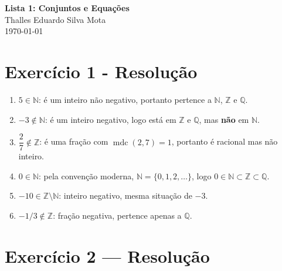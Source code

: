 \documentclass[12pt, a4paper]{article}
\newcommand{\NomeAluno}{Thalles Eduardo Silva Mota}             %
\begin{document}
\begin{center}
  {\Large\bfseries\color{ufmtAzul} Lista 1: Conjuntos e Equações}\\[6pt]
  {\large \NomeAluno}\\[3pt]
  {\normalsize\color{ufmtCinza} \today}
\end{center}

\vspace{0.5cm}

\section*{Exercício 1 - Resolução}
 
\begin{enumerate}[label=(\alph*)]
 
    \item $5 \in \mathbb{N}$: é um inteiro não negativo, portanto pertence
    a $\mathbb{N}$, $\mathbb{Z}$ e $\mathbb{Q}$.
 
    \item $-3 \notin \mathbb{N}$: é um inteiro negativo, logo está em
    $\mathbb{Z}$ e $\mathbb{Q}$, mas \textbf{não} em $\mathbb{N}$.
 
    \item $\dfrac{2}{7} \notin \mathbb{Z}$: é uma fração com
    $\operatorname{mdc}(2,7) = 1$, portanto é racional mas não inteiro.
 
    \item $0 \in \mathbb{N}$: pela convenção moderna,
    $\mathbb{N} = \{0, 1, 2, \ldots\}$, logo $0 \in \mathbb{N} \subset
    \mathbb{Z} \subset \mathbb{Q}$.
 
    \item $-10 \in \mathbb{Z} \setminus \mathbb{N}$: inteiro negativo,
    mesma situação de $-3$.
 
    \item $-1/3 \notin \mathbb{Z}$: fração negativa, pertence apenas
    a $\mathbb{Q}$.
 
\end{enumerate}

\section*{Exercício 2 — Resolução}
\end{document}
